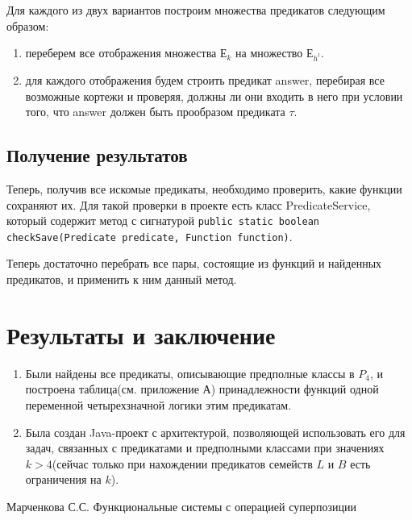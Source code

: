 \documentclass[a4paper,14pt]{extreport}
\begin{document}
Для каждого из двух вариантов построим множества предикатов следующим образом:
\begin{enumerate}
\item переберем все отображения множества $Е_k$ на  множество $Е_{h^l}$.
\item для каждого отображения будем строить предикат answer, перебирая все возможные кортежи и проверяя, должны ли они входить в него при условии того, что answer должен быть прообразом предиката $\tau$.
\end{enumerate} 
\section{Получение результатов}
Теперь, получив все искомые предикаты, необходимо проверить, какие функции сохраняют их. Для такой проверки в проекте есть класс PredicateService, который содержит метод с сигнатурой {\tt public static boolean checkSave(Predicate predicate, Function function)}. 

Теперь достаточно перебрать все пары, состоящие из функций и найденных предикатов, и применить к ним данный метод.

\chapter{Результаты и заключение}
\begin{enumerate}
\item Были найдены все предикаты, описывающие предполные классы в $P_4$, и построена таблица(см. приложение А) принадлежности функций одной переменной четырехзначной логики этим предикатам. 
\item Была создан Java-проект с архитектурой, позволяющей использовать его для задач, связанных с предикатами и предполными классами при значениях $k>4$(сейчас только при нахождении предикатов семейств $L$ и $B$ есть ограничения на $k$).
\end{enumerate}


\newpage
{}
\begin{thebibliography}{9}
 Марченкова С.С. Функциональные системы с операцией суперпозиции
\end{thebibliography}
\end{document}
